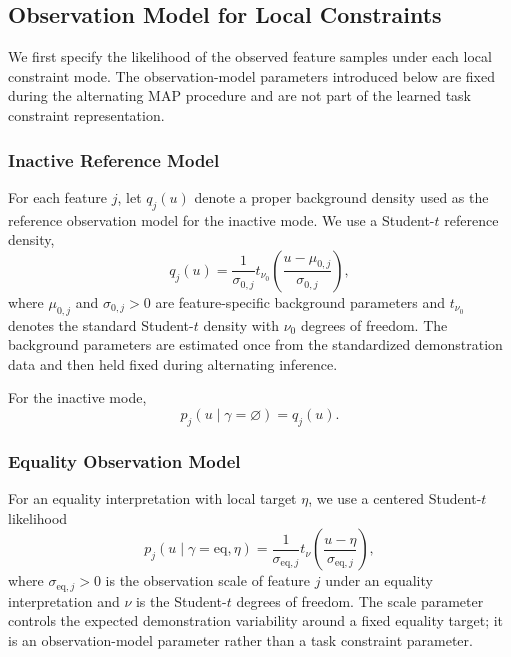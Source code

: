 \documentclass[lettersize,journal]{IEEEtran}
\begin{document}
\subsection{Observation Model for Local Constraints}
\label{subsec:observation_model_map}

We first specify the likelihood of the observed feature samples under each local
constraint mode. The observation-model parameters introduced below are fixed
during the alternating MAP procedure and are not part of the learned task
constraint representation.

\subsubsection{Inactive Reference Model}

For each feature $j$, let
$q_j(u)$ denote a proper background density used as the reference observation
model for the inactive mode. We use a Student-$t$ reference density,
\begin{equation}
q_j(u)
=
\frac{1}{\sigma_{0,j}}
t_{\nu_0}
\left(
\frac{u-\mu_{0,j}}{\sigma_{0,j}}
\right),
\label{eq:inactive_reference_density}
\end{equation}
where $\mu_{0,j}$ and $\sigma_{0,j}>0$ are feature-specific background
parameters and $t_{\nu_0}$ denotes the standard Student-$t$ density with
$\nu_0$ degrees of freedom. The background parameters are estimated once from
the standardized demonstration data and then held fixed during alternating
inference.

For the inactive mode,
\begin{equation}
p_j
\left(
u
\mid
\gamma=\varnothing
\right)
=
q_j(u).
\label{eq:inactive_observation_model}
\end{equation}

\subsubsection{Equality Observation Model}

For an equality interpretation with local target $\eta$, we use a centered
Student-$t$ likelihood
\begin{equation}
p_j
\left(
u
\mid
\gamma=\mathrm{eq},
\eta
\right)
=
\frac{1}{\sigma_{\mathrm{eq},j}}
t_{\nu}
\left(
\frac{u-\eta}{\sigma_{\mathrm{eq},j}}
\right),
\label{eq:equality_student_t_likelihood}
\end{equation}
where $\sigma_{\mathrm{eq},j}>0$ is the observation scale of feature $j$ under
an equality interpretation and $\nu$ is the Student-$t$ degrees of freedom.
The scale parameter controls the expected demonstration variability around a
fixed equality target; it is an observation-model parameter rather than a task
constraint parameter.
\end{document}
